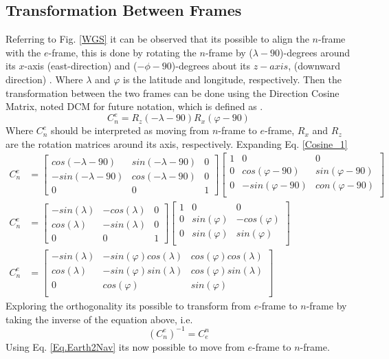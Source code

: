\subsection{Transformation Between Frames}
Referring to Fig. \ref{WGS} it can be observed that its possible to align the $n$-frame with the $e$-frame, this is done by rotating the $n$-frame by ($\lambda-90$)-degrees around its $x$-axis (east-direction) and ($-\phi-90$)-degrees about its $z-axis$, (downward direction) \cite{nonlinear}. Where $\lambda$ and $\varphi$ is the latitude and longitude, respectively. Then the transformation between the two frames can be done using the Direction Cosine Matrix, noted DCM for future notation, which is defined as \cite{nonlinear}.
\begin{equation}
C_n^e=R_z(-\lambda-90)R_x(\varphi-90)
\label{Cosine_1}
\end{equation}
Where $C_n^e$ should be interpreted as moving from $n$-frame to $e$-frame, $R_x$ and $R_z$ are the rotation matrices around its axis, respectively. Expanding Eq. \eqref{Cosine_1} 
\begin{align}
C_n^e &=
\begin{bmatrix}
cos(-\lambda-90) & sin(-\lambda-90) & 0\\
-sin(-\lambda-90) & cos(-\lambda-90) & 0\\
0 & 0 & 1
\end{bmatrix}
\begin{bmatrix}
1 & 0 & 0\\
0 & cos(\varphi-90) & sin(\varphi-90) \\
0 & -sin(\varphi-90) & con(\varphi-90) \\
\end{bmatrix}\\
C_n^e &=
\begin{bmatrix}
-sin(\lambda) & -cos(\lambda) & 0\\
cos(\lambda) & -sin(\lambda) & 0\\
0 & 0 & 1
\end{bmatrix}
\begin{bmatrix}
1 & 0 & 0\\
0 & sin(\varphi) & -cos(\varphi) \\
0 & sin(\varphi) & sin(\varphi) \\
\end{bmatrix}\\
C_n^e &=
\begin{bmatrix}
-sin(\lambda) & -sin(\varphi)cos(\lambda) & cos(\varphi)cos(\lambda) \\
cos(\lambda) & -sin(\varphi)sin(\lambda) &  cos(\varphi)sin(\lambda) \\
0 & cos(\varphi) & sin(\varphi) \\
\end{bmatrix}
\end{align}
Exploring the orthogonality its possible to transform from $e$-frame to $n$-frame by taking the inverse of the equation above, i.e.
\begin{equation}
(C_n^e)^{-1}=C_e^n
\label{Eq.Earth2Nav}
\end{equation}
Using Eq. \eqref{Eq.Earth2Nav} its now possible to move from $e$-frame to $n$-frame. \\


